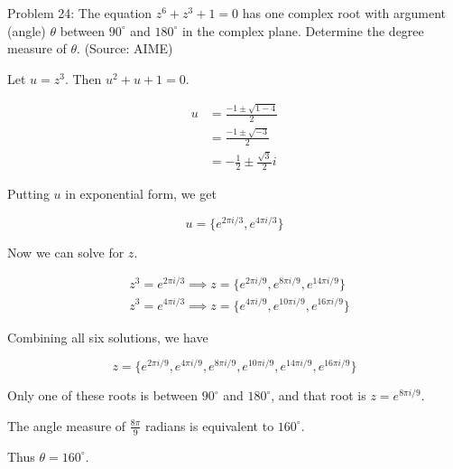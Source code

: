 Problem 24: The equation $z^6 + z^3 + 1 = 0$ has one complex root with argument (angle) $\theta$ between $90^\circ$ and $180^\circ$ in the complex plane. Determine the degree measure of $\theta$. (Source: AIME)

Let $u = z^3$. Then $u^2 + u + 1 = 0$.

\begin{align*}
u &= \frac{-1 \pm \sqrt{1 - 4}}{2} \\
&= \frac{-1 \pm \sqrt{-3}}{2} \\
&= -\frac{1}{2} \pm \frac{\sqrt 3}{2}i
\end{align*}

Putting $u$ in exponential form, we get

$$ u = \{e^{2 \pi i / 3}, e^{4 \pi i / 3}\} $$

Now we can solve for $z$.

\begin{align*}
& z^3 = e^{2 \pi i / 3}
\implies z = \{e^{2 \pi i / 9}, e^{8 \pi i / 9}, e^{14 \pi i / 9}\} \\
& z^3 = e^{4 \pi i / 3}
\implies z = \{e^{4 \pi i / 9}, e^{10 \pi i / 9}, e^{16 \pi i / 9}\}
\end{align*}

Combining all six solutions, we have

$$ z = \{e^{2 \pi i / 9}, e^{4 \pi i / 9}, e^{8 \pi i / 9}, e^{10 \pi i / 9}, e^{14 \pi i / 9}, e^{16 \pi i / 9}\} $$

Only one of these roots is between $90^{\circ}$ and $180^{\circ}$, and that root is $z = e^{8 \pi i / 9}$.

The angle measure of $\frac{8\pi}{9}$ radians is equivalent to $160^{\circ}$.

Thus $\boxed{\theta = 160^{\circ}}$.
